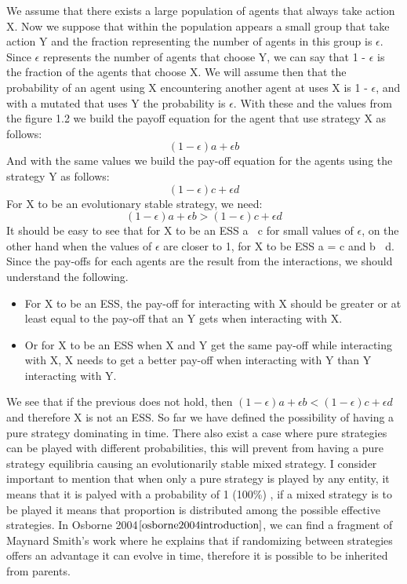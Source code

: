\documentclass{book}
\begin{document}
We assume that there exists a large population of agents that always take action X. Now we suppose that within the population appears a small group that take action Y and the   fraction representing the number of agents in this group is $\epsilon$.  Since $\epsilon$ represents the number of agents that choose Y, we can say that 1 - $\epsilon$ is the fraction of the agents that choose X.  We will assume then that the probability of an agent using X encountering another agent at uses X is 1 - $\epsilon$, and with a mutated that uses Y the probability is $\epsilon$.  With these and the values from the figure 1.2 we build the payoff equation for the agent that use strategy X as follows:
\begin{equation}
(1-{\epsilon})a + {\epsilon}b
\end{equation}
And with the same values we build the pay-off equation for the agents using the strategy Y as follows:
\begin{equation}
(1-{\epsilon})c + {\epsilon}d
\end{equation}
For X to be an evolutionary stable strategy, we need:
\begin{equation}
(1-{\epsilon})a + {\epsilon}b > (1-{\epsilon})c + {\epsilon}d
\end{equation}
It should be easy to see that for X to be an ESS a $\>$ c for small values of $\epsilon$, on the other hand when the values of $\epsilon$ are closer to 1, for X to be ESS a = c and b $\>$ d.
Since the pay-offs for each agents are the result from the interactions, we should understand the following.
\begin{itemize}
\item For X to be an ESS, the pay-off for interacting with X should be greater or at least equal to the pay-off that an Y gets when interacting with X.
\item Or for X to be an ESS when X and Y get the same pay-off while interacting with X, X needs to get a better pay-off when interacting with Y than Y interacting with Y.
\end{itemize}
We see that if the previous does not hold, then $(1-{\epsilon})a + {\epsilon}b < (1-{\epsilon})c + {\epsilon}d$ and therefore X is not an ESS.
So far we have defined the possibility of having a pure strategy dominating in time. There also exist a case where pure strategies can be played with different probabilities, this will prevent from having a pure strategy equilibria causing an evolutionarily stable mixed strategy. I consider important to mention that when only a pure strategy is played by any entity, it means that it is palyed with a probability of 1 (100\%) , if a mixed strategy is to be played it means that proportion is distributed among the possible effective strategies. In Osborne 2004$\cite{osborne2004introduction}$, we can find a fragment of Maynard Smith's work where he explains that  if randomizing between strategies offers an advantage it can evolve in time, therefore it is possible to be inherited from parents. 
\end{document}
